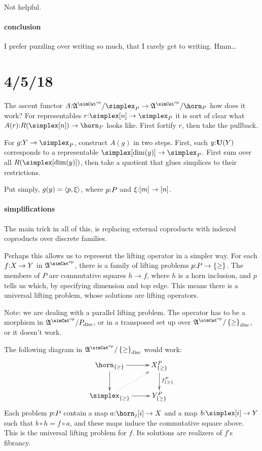 \documentclass[csh.tex]{subfiles}
\begin{document}
Not helpful.

\paragraph{conclusion}
I prefer puzzling over writing so much, that I rarely get to writing. Hmm\dots


\section{4/5/18}

The ascent functor $A\of \ambient\s/\simplex_P \to \ambient\s/\horn_P$ how does it work? For representables $r\of \simplex[n]\to \simplex_P$ it is sort of clear what $A(r)\of R(\simplex[n])\to\horn_P$ looks like. First fortify $r$, then take the pullback.

For $g\of Y\to \simplex_P$, construct $A(g)$ in two steps. First, each $y\mathord :\mathbf{U}(Y)$ corresponds to a representable $\simplex[\dim(y)]\to \simplex_P$. First sum over all $R(\simplex[\dim(y)])$, then take a quotient that glues simplices to their restrictions.


Put simply, $g(y) = \left\langle p,\xi \right\rangle$, where $p\mathord : P$ and $\xi\mathord :[m]\to[n]$. 

\paragraph{simplifications}
The main trick in all of this, is replacing external coproducts with indexed coproducts over discrete families.

Perhaps this allows us to represent the lifting operator in a simpler way. For each $f\mathord : X\to Y$ in $\ambient\s$, there is a family of lifting problems $p\mathord : P\to \left\{\geq\right\}$. The members of $P$ are commutative squares $h\to f$, where $h$ is a horn inclusion, and $p$ tells us which, by specifying dimension and top edge. This means there is a universal lifting problem, whose solutions are lifting operators.
 
Note: we are dealing with a parallel lifting problem. The operator has to be a morphism in $\ambient\s/P\disc$, or in a transposed set up over $\ambient\s/\set\geq\disc$, or it doesn't work.

The following diagram in $\ambient\s/\set\geq\disc$ would work:
\[\xymatrix{
\horn_{\set\geq}\ar[d]\ar[r] & X^P_{\set\geq}\ar[d]^{f^P_{\set\geq}}\\
\simplex_{\set\geq}\ar[r]\ar@{.>}[ur] & Y^P_{\set\geq}
}\]
Each problem $p\mathord : P$ contain a map $a\of\horn_j[i]\to X$ and a map $b\of\simplex[i]\to Y$ such that $b\circ h = f\circ a$, and these maps induce the commutative square above. This is the universal lifting problem for $f$. Its solutions are realizers of $f$'s fibrancy.
\end{document}
